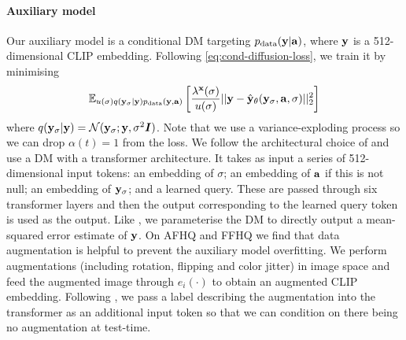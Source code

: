 \paragraph{Auxiliary model}
Our auxiliary model is a conditional DM targeting $p_{\rm{data}}({\mathbf{y}}|{\mathbf{a}})$, where ${\mathbf{y}}$ is a 512-dimensional CLIP embedding. Following \cref{eq:cond-diffusion-loss}, we train it by minimising
\begin{equation}
\label{eq:auxiliary-model-objective}
    \mathbb{E}_{u(\sigma)q({\mathbf{y}}_\sigma|{\mathbf{y}})p_{\rm{data}}({\mathbf{y}},{\mathbf{a}})} \left[ \frac{\lambda^{\mathbf{x}}(\sigma)}{u(\sigma)} \lvert\lvert {\mathbf{y}} - \hat{{\mathbf{y}}}_\theta({\mathbf{y}}_\sigma, {\mathbf{a}}, \sigma) \rvert\rvert_2^2 \right]
\end{equation}
where $q({\mathbf{y}}_\sigma|{\mathbf{y}}) = {\mathcal{N}}({\mathbf{y}}_\sigma; {\mathbf{y}}, \sigma^2{\bm{I}})$. Note that we use a variance-exploding process so we can drop $\alpha(t) = 1$ from the loss. We follow the architectural choice of \citet{ramesh2022hierarchical} and use a DM with a transformer architecture. It takes as input a series of 512-dimensional input tokens: an embedding of $\sigma$; an embedding of ${\mathbf{a}}$ if this is not null; an embedding of ${\mathbf{y}}_\sigma$; and a learned query. These are passed through six transformer layers and then the output corresponding to the learned query token is used as the output. Like \citet{ramesh2022hierarchical}, we parameterise the DM to directly output a mean-squared error estimate of ${\mathbf{y}}$.
%
On AFHQ and FFHQ we find that data augmentation is helpful to prevent the auxiliary model overfitting. We perform augmentations (including rotation, flipping and color jitter) in image space and feed the augmented image through $e_i(\cdot)$ to obtain an augmented CLIP embedding. Following \citet{karras2022elucidating}, we pass a label describing the augmentation into the transformer as an additional input token so that we can condition on there being no augmentation at test-time.



